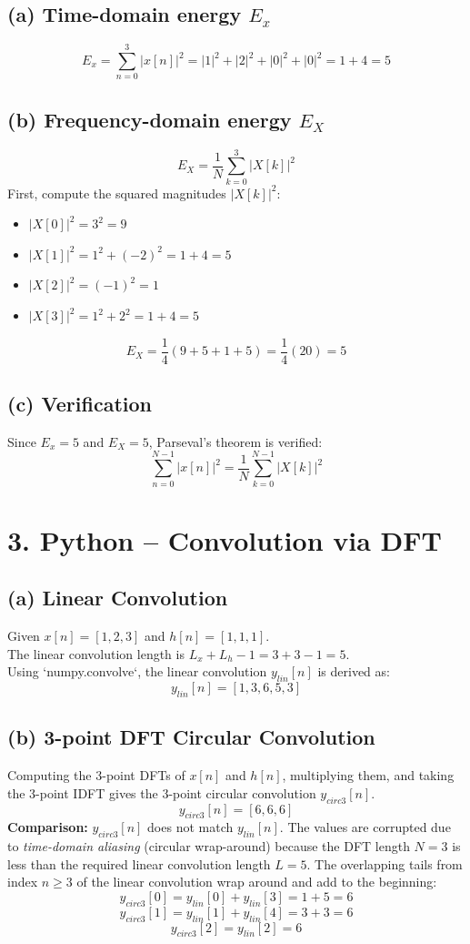 \documentclass[11pt, a4paper]{article}
\begin{document}
\subsection{(a) Time-domain energy $E_x$}
$$ E_x = \sum_{n=0}^{3} |x[n]|^2 = |1|^2 + |2|^2 + |0|^2 + |0|^2 = 1 + 4 = 5 $$

\subsection{(b) Frequency-domain energy $E_X$}
$$ E_X = \frac{1}{N} \sum_{k=0}^{3} |X[k]|^2 $$
First, compute the squared magnitudes $|X[k]|^2$:
\begin{itemize}
    \item $|X[0]|^2 = 3^2 = 9$
    \item $|X[1]|^2 = 1^2 + (-2)^2 = 1 + 4 = 5$
    \item $|X[2]|^2 = (-1)^2 = 1$
    \item $|X[3]|^2 = 1^2 + 2^2 = 1 + 4 = 5$
\end{itemize}

$$ E_X = \frac{1}{4} (9 + 5 + 1 + 5) = \frac{1}{4} (20) = 5 $$

\subsection{(c) Verification}
Since $E_x = 5$ and $E_X = 5$, Parseval's theorem is verified:
$$ \sum_{n=0}^{N-1} |x[n]|^2 = \frac{1}{N} \sum_{k=0}^{N-1} |X[k]|^2 $$

\section{3. Python – Convolution via DFT}

\subsection{(a) Linear Convolution}
Given $x[n] = [1, 2, 3]$ and $h[n] = [1, 1, 1]$. \\
The linear convolution length is $L_x + L_h - 1 = 3 + 3 - 1 = 5$. \\
Using `numpy.convolve`, the linear convolution $y_{lin}[n]$ is derived as:
$$ y_{lin}[n] = [1, 3, 6, 5, 3] $$

\subsection{(b) 3-point DFT Circular Convolution}
Computing the 3-point DFTs of $x[n]$ and $h[n]$, multiplying them, and taking the 3-point IDFT gives the 3-point circular convolution $y_{circ3}[n]$.
$$ y_{circ3}[n] = [6, 6, 6] $$
\textbf{Comparison:} $y_{circ3}[n]$ does not match $y_{lin}[n]$. The values are corrupted due to \textit{time-domain aliasing} (circular wrap-around) because the DFT length $N=3$ is less than the required linear convolution length $L = 5$. The overlapping tails from index $n \ge 3$ of the linear convolution wrap around and add to the beginning:
$$ y_{circ3}[0] = y_{lin}[0] + y_{lin}[3] = 1 + 5 = 6 $$
$$ y_{circ3}[1] = y_{lin}[1] + y_{lin}[4] = 3 + 3 = 6 $$
$$ y_{circ3}[2] = y_{lin}[2] = 6 $$
\end{document}
